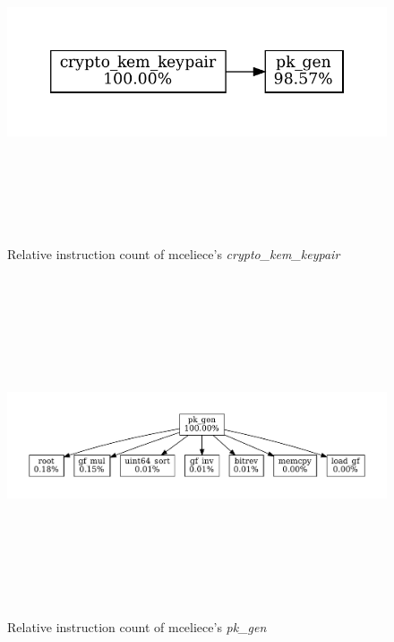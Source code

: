 \begin{figure}[H]
    \centering
    \includegraphics[width=15cm, height=10cm, keepaspectratio]{chapters/results/hot-paths/classic-mceliece/8192128/crypto_kem_keypair.pdf}
    \caption{Relative instruction count of \gls{mceliece}'s \textit{crypto\_kem\_keypair}}
    \label{figure:result:hot-paths:classic-mceliece:crypto_kem_keypair}
\end{figure}

\begin{figure}[H]
    \centering
    \includegraphics[width=15cm, height=10cm, keepaspectratio]{chapters/results/hot-paths/classic-mceliece/8192128/pk_gen.pdf}
    \caption{Relative instruction count of \gls{mceliece}'s \textit{pk\_gen}}
    \label{figure:result:hot-paths:classic-mceliece:pk_gen}
\end{figure}

